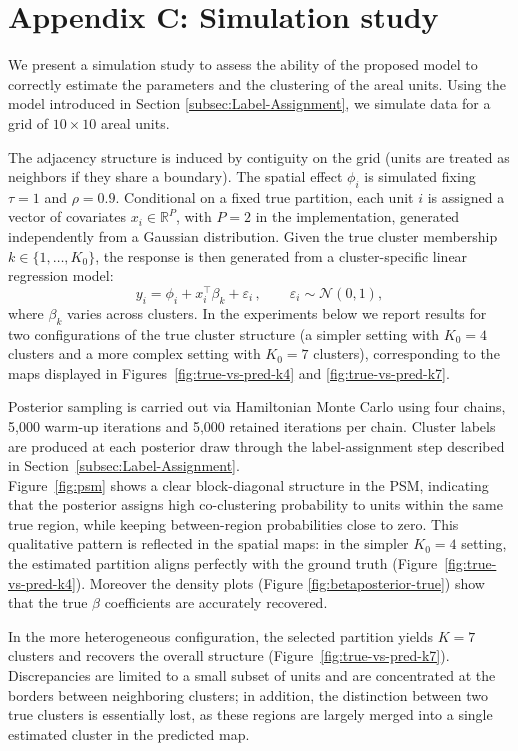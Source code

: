 \newpage
\section*{Appendix C: Simulation study}\label{subsec:sim-study}

We present a simulation study to assess the ability of the proposed model to correctly estimate the parameters and the clustering of the areal units. Using the model introduced in Section \ref{subsec:Label-Assignment}, we simulate data for a grid of $10 \times 10$ areal units.

The adjacency structure is induced by contiguity on the grid (units are treated as neighbors if they share a boundary). The spatial effect $\phi_i$ is simulated fixing $\tau = 1$ and $\rho = 0.9$. Conditional on a fixed true partition, each unit $i$ is assigned a vector of covariates $x_i \in \mathbb{R}^{P}$, with $P=2$ in the implementation, generated independently from a Gaussian distribution. Given the true cluster membership $k \in \{1,\dots,K_0\}$, the response is then generated from a cluster-specific linear regression model:
\[
y_i = \phi_i + x_i^\top \beta_{k} + \varepsilon_i \, , 
\qquad \varepsilon_i \sim \mathcal{N}(0,1),
\]
where $\beta_k$ varies across clusters. In the experiments below we report results for two configurations of the true cluster structure (a simpler setting with $K_0=4$ clusters and a more complex setting with $K_0=7$ clusters), corresponding to the maps displayed in Figures~\ref{fig:true-vs-pred-k4} and \ref{fig:true-vs-pred-k7}.

Posterior sampling is carried out via Hamiltonian Monte Carlo using four chains, 5,000 warm-up iterations and 5,000 retained iterations per chain. Cluster labels are produced at each posterior draw through the label-assignment step described in Section~\ref{subsec:Label-Assignment}.\\

Figure~\ref{fig:psm} shows a clear block-diagonal structure in the PSM, indicating that the posterior assigns high co-clustering probability to units within the same true region, while keeping between-region probabilities close to zero. This qualitative pattern is reflected in the spatial maps: in the simpler $K_0=4$ setting, the estimated partition aligns perfectly with the ground truth (Figure~\ref{fig:true-vs-pred-k4}). Moreover the density plots (Figure \ref{fig:betaposterior-true}) show that the true $\beta$ coefficients are accurately recovered.

In the more heterogeneous configuration, the selected partition yields $K=7$ clusters and recovers the overall structure (Figure~\ref{fig:true-vs-pred-k7}). Discrepancies are limited to a small subset of units and are concentrated at the borders between neighboring clusters; in addition, the distinction between two true clusters is essentially lost, as these regions are largely merged into a single estimated cluster in the predicted map.


